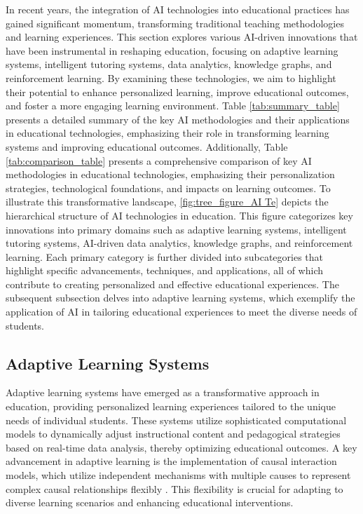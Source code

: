 In recent years, the integration of AI technologies into educational practices has gained significant momentum, transforming traditional teaching methodologies and learning experiences. This section explores various AI-driven innovations that have been instrumental in reshaping education, focusing on adaptive learning systems, intelligent tutoring systems, data analytics, knowledge graphs, and reinforcement learning. By examining these technologies, we aim to highlight their potential to enhance personalized learning, improve educational outcomes, and foster a more engaging learning environment. Table \ref{tab:summary_table} presents a detailed summary of the key AI methodologies and their applications in educational technologies, emphasizing their role in transforming learning systems and improving educational outcomes. Additionally, Table \ref{tab:comparison_table} presents a comprehensive comparison of key AI methodologies in educational technologies, emphasizing their personalization strategies, technological foundations, and impacts on learning outcomes. To illustrate this transformative landscape, \autoref{fig:tree_figure_AI Te} depicts the hierarchical structure of AI technologies in education. This figure categorizes key innovations into primary domains such as adaptive learning systems, intelligent tutoring systems, AI-driven data analytics, knowledge graphs, and reinforcement learning. Each primary category is further divided into subcategories that highlight specific advancements, techniques, and applications, all of which contribute to creating personalized and effective educational experiences. The subsequent subsection delves into adaptive learning systems, which exemplify the application of AI in tailoring educational experiences to meet the diverse needs of students.










\subsection{Adaptive Learning Systems} \label{subsec:Adaptive Learning Systems}

Adaptive learning systems have emerged as a transformative approach in education, providing personalized learning experiences tailored to the unique needs of individual students. These systems utilize sophisticated computational models to dynamically adjust instructional content and pedagogical strategies based on real-time data analysis, thereby optimizing educational outcomes. A key advancement in adaptive learning is the implementation of causal interaction models, which utilize independent mechanisms with multiple causes to represent complex causal relationships flexibly \cite{meek2015structureparameterlearningcausal}. This flexibility is crucial for adapting to diverse learning scenarios and enhancing educational interventions. 


